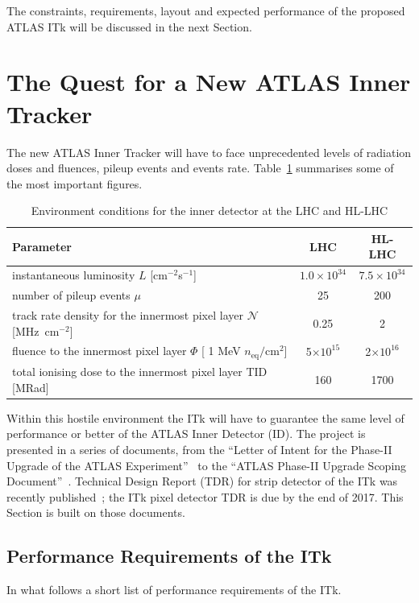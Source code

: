 The constraints, requirements, layout and expected performance of the proposed ATLAS ITk will 
be discussed in the next Section.

\section{The Quest for a New ATLAS Inner Tracker}
\label{sec:NewTracker}

The new ATLAS  Inner Tracker will have to face unprecedented levels of radiation doses and fluences, 
pileup events and events rate. Table~\ref{tab:ITkConditions} summarises some of the most important figures.

\begin{table}[!htpb]
\centering
\caption{\label{tab:ITkConditions}Environment conditions for the inner detector at the LHC and HL-LHC}
\begin{tabular}{lcc}
\hline
\hline
Parameter & LHC & HL-LHC \\
\hline
instantaneous luminosity $L$	 [cm$^{-2}$s$^{-1}$] & $1.0\times10^{34}$ &  $7.5\times10^{34}$ \\
number of pileup events $\mu$ & 25 & 200\\
track rate density for the innermost pixel layer $\mathcal{N}$ [MHz~cm$^{-2}$] & 0.25 & 2 \\ 
fluence to the innermost pixel layer $\Phi$ [ 1 MeV $n_\text{eq}/\text{cm}^2$] & 5$\times10^{15}$ & 2$\times10^{16}$ \\
total ionising dose to the innermost pixel layer TID [MRad] & 160  & 1700 \\
\hline
\end{tabular}
\end{table}

Within this hostile environment the ITk will have to guarantee the same level of performance  or better 
of the ATLAS Inner Detector (ID).
The project is presented  in a series of documents, from the ``Letter of Intent for the Phase-II Upgrade of the ATLAS Experiment''~\cite{ATLASLoIPhaseII} to the ``ATLAS Phase-II Upgrade Scoping Document''~\cite{ATLASITkScopingDocument}. Technical Design Report (TDR) for strip detector of the 
ITk was recently published~\cite{ITkStripsTDR}; the ITk pixel detector TDR is due by the end of 2017.
This Section is built on those documents.




\subsection{Performance Requirements of the ITk}
In what follows a short list of performance requirements of the ITk.

